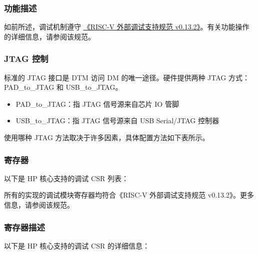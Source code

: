 \documentclass[main\_\_CN.tex]{subfiles}
\begin{document}
\subsubsection{功能描述}
\label{sec:riscvcpu-dbg-func-descr}

如前所述，调试机制遵守 \href{https://riscv.org/wp-content/uploads/2019/03/riscv-debug-release.pdf}{《RISC-V 外部调试支持规范 v0.13.2》}。有关功能操作的详细信息，请参阅该规范。

\subsubsection{JTAG 控制}
\label{sec:riscvcpu-dbg-jtag-cntl}

标准的 JTAG 接口是 DTM 访问 DM 的唯一途径。硬件提供两种 JTAG 方式：PAD\_to\_JTAG 和 USB\_to\_JTAG。

\begin{itemize}
    \item {PAD\_to\_JTAG：指 JTAG 信号源来自芯片 IO 管脚}
    \item {USB\_to\_JTAG：指 JTAG 信号源来自 USB Serial/JTAG 控制器}
\end{itemize}

使用哪种 JTAG 方法取决于许多因素，具体配置方法如下表所示。






\hypertarget{riscvcpu-dbg-reg-summ}{}
\subsubsection{寄存器}
\label{sec:riscvcpu-dbg-reg-summ}

以下是 HP 核心支持的调试 CSR 列表：


所有的实现的调试模块寄存器均符合《RISC-V 外部调试支持规范 v0.13.2》。更多信息，请参阅该规范。



\subsubsection{寄存器描述}
以下是 HP 核心支持的调试 CSR 的详细信息：



\end{document}
